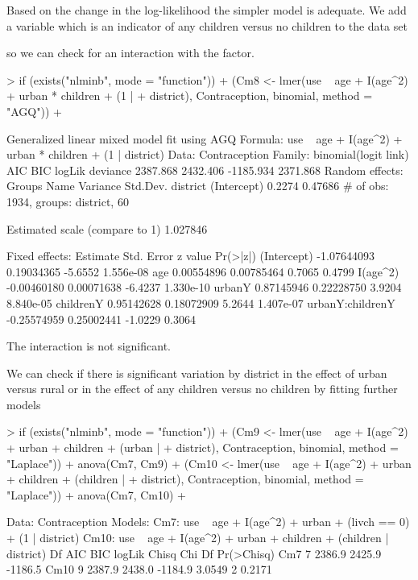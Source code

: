 \documentclass[12pt]{article}
\begin{document}
Based on the change in the log-likelihood the simpler model is
adequate.  We add a variable  which is an indicator of
any children versus no children to the data set
\begin{Schunk}
\end{Schunk}
so we can check for an interaction with the  factor.
\begin{Schunk}
\begin{Sinput}
> if (exists("nlminb", mode = "function")) {
+     (Cm8 <- lmer(use ~ age + I(age^2) + urban * children + (1 | 
+         district), Contraception, binomial, method = "AGQ"))
+ }
\end{Sinput}
\begin{Soutput}
Generalized linear mixed model fit using AGQ 
Formula: use ~ age + I(age^2) + urban * children + (1 | district) 
   Data: Contraception 
 Family: binomial(logit link)
      AIC      BIC    logLik deviance
 2387.868 2432.406 -1185.934 2371.868
Random effects:
     Groups        Name    Variance    Std.Dev. 
   district (Intercept)      0.2274     0.47686 
# of obs: 1934, groups: district, 60

Estimated scale (compare to 1)  1.027846 

Fixed effects:
                    Estimate  Std. Error z value  Pr(>|z|)
(Intercept)      -1.07644093  0.19034365 -5.6552 1.556e-08
age               0.00554896  0.00785464  0.7065    0.4799
I(age^2)         -0.00460180  0.00071638 -6.4237 1.330e-10
urbanY            0.87145946  0.22228750  3.9204 8.840e-05
childrenY         0.95142628  0.18072909  5.2644 1.407e-07
urbanY:childrenY -0.25574959  0.25002441 -1.0229    0.3064
\end{Soutput}
\end{Schunk}
The interaction is not significant.

We can check if there is significant variation by district in the
effect of urban versus rural or in the effect of any children versus
no children by fitting further models
\begin{Schunk}
\begin{Sinput}
> if (exists("nlminb", mode = "function")) {
+     (Cm9 <- lmer(use ~ age + I(age^2) + urban + children + (urban | 
+         district), Contraception, binomial, method = "Laplace"))
+     anova(Cm7, Cm9)
+     (Cm10 <- lmer(use ~ age + I(age^2) + urban + children + (children | 
+         district), Contraception, binomial, method = "Laplace"))
+     anova(Cm7, Cm10)
+ }
\end{Sinput}
\begin{Soutput}
Data: Contraception
Models:
Cm7: use ~ age + I(age^2) + urban + (livch == 0) + (1 | district)
Cm10: use ~ age + I(age^2) + urban + children + (children | district)
     Df     AIC     BIC  logLik  Chisq Chi Df Pr(>Chisq)
Cm7   7  2386.9  2425.9 -1186.5                         
Cm10  9  2387.9  2438.0 -1184.9 3.0549      2     0.2171
\end{Soutput}
\end{Schunk}
\end{document}
